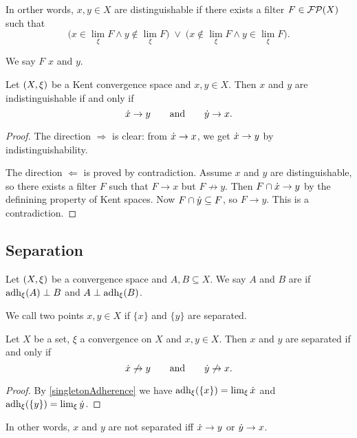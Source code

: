 In orther words, $x,y \in X$ are distinguishable if there exists a filter $F \in \operatorname{\mathcal{FP}}(X)$ such that
\[ \Big(x\in \lim_\xi F \land y\notin \lim_\xi F\Big)\;\lor\; \Big(x\notin \lim_\xi F \land y\in \lim_\xi F\Big). \]

We say $F$  $x$ and $y$.

\begin{proposition} \label{distinguishabilityPrincipalUltrafilters}
Let $\sSet{X,\xi}$ be a Kent convergence space and $x,y\in X$. Then $x$ and $y$ are indistinguishable \textup{if and only if}
\[ \dot{x} \to y \qquad \text{and}\qquad \dot{y}\to x. \]
\end{proposition}
\begin{proof}
The direction $\Rightarrow$ is clear: from $\dot{x} \to x$, we get $\dot{x}\to y$ by indistinguishability.

The direction $\Leftarrow$ is proved by contradiction. Assume $x$ and $y$ are distinguishable, so there exists a filter $F$ such that $F\to x$ but $F\not\to y$. Then $F\cap \dot{x} \to y$ by the definining property of Kent spaces. Now $F\cap \dot{y} \subseteq F$, so $F\to y$. This is a contradiction.
\end{proof}


\subsection{Separation}
\begin{definition}
Let $\sSet{X,\xi}$ be a convergence space and $A,B\subseteq X$. We say $A$ and $B$ are  if $\operatorname{adh}_\xi(A) \perp B$ and $A\perp \operatorname{adh}_\xi(B)$.

We call two points $x,y\in X$  if $\{x\}$ and $\{y\}$ are separated.
\end{definition}

\begin{proposition} \label{separatednessPrincipalUltrafilters}
Let $X$ be a set, $\xi$ a convergence on $X$ and $x,y\in X$. Then $x$ and $y$ are separated \textup{if and only if}
\[ \dot{x} \not\to y \qquad \text{and}\qquad \dot{y}\not\to x. \]
\end{proposition}
\begin{proof}
By \ref{singletonAdherence} we have $\operatorname{adh}_\xi(\{x\}) = \lim_\xi\dot{x}$ and $\operatorname{adh}_\xi(\{y\}) = \lim_\xi\dot{y}$.
\end{proof}
In other words, $x$ and $y$ are not separated iff $\dot{x} \to y$ or $\dot{y} \to x$.

